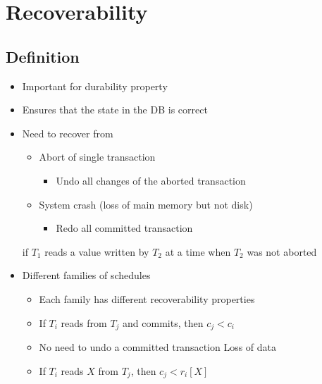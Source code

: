 
\section{Recoverability}
\subsection{Definition}
\begin{itemize}
    \item Important for durability property
    \item Ensures that the state in the DB is correct
    \item Need to recover from
        \begin{itemize}
            \item Abort of single transaction
                \begin{itemize}
                    \item Undo all changes of the aborted transaction
                \end{itemize}
            \item System crash (loss of main memory but not disk)
                \begin{itemize}
                    \item Redo all committed transaction
                \end{itemize}
        \end{itemize}
     if $T_1$ reads a value written by $T_2$ at a time when $T_2$ was not aborted
    \item Different families of schedules
        \begin{itemize}
            \item Each family has different recoverability properties
        \end{itemize}
        \begin{itemize}
            \item If $T_i$ reads from $T_j$ and commits, then $c_j < c_i$
            \item No need to undo a committed transaction
             Loss of data
        \end{itemize}
        \begin{itemize}
            \item If $T_i$ reads $X$ from $T_j$, then $c_j < r_i[X]$

\end{itemize}
\end{itemize}
